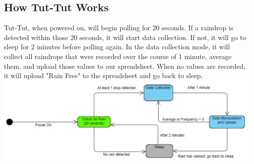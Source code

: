 \documentclass[letterpaper,10pt,draftclsnofoot,onecolumn]{article}
\begin{document}
\subsection{How Tut-Tut Works}
Tut-Tut, when powered on, will begin polling for 20 seconds. If a raindrop is detected within those 20 seconds, it will start data collection. If not, it will go to sleep for 2 minutes before polling again. In the data collection mode, it will collect all raindrops that were recorded over the course of 1 minute, average them, and upload those values to our spreadsheet. When no values are recorded, it will upload "Rain Free" to the spreadsheet and go back to sleep.
\includegraphics[width=1.0\textwidth]{TutTut_FSM.eps}
\end{document}
